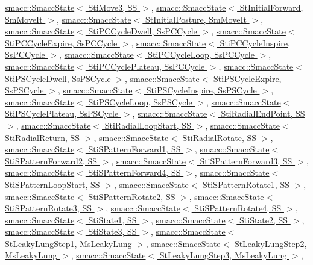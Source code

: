 \hyperlink{classsmacc_1_1SmaccState}{smacc\+::\+Smacc\+State$<$ Sti\+Move3, S\+S $>$}, \hyperlink{classsmacc_1_1SmaccState}{smacc\+::\+Smacc\+State$<$ St\+Initial\+Forward, Sm\+Move\+It $>$}, \hyperlink{classsmacc_1_1SmaccState}{smacc\+::\+Smacc\+State$<$ St\+Initial\+Posture, Sm\+Move\+It $>$}, \hyperlink{classsmacc_1_1SmaccState}{smacc\+::\+Smacc\+State$<$ Sti\+P\+C\+Cycle\+Dwell, Ss\+P\+C\+Cycle $>$}, \hyperlink{classsmacc_1_1SmaccState}{smacc\+::\+Smacc\+State$<$ Sti\+P\+C\+Cycle\+Expire, Ss\+P\+C\+Cycle $>$}, \hyperlink{classsmacc_1_1SmaccState}{smacc\+::\+Smacc\+State$<$ Sti\+P\+C\+Cycle\+Inspire, Ss\+P\+C\+Cycle $>$}, \hyperlink{classsmacc_1_1SmaccState}{smacc\+::\+Smacc\+State$<$ Sti\+P\+C\+Cycle\+Loop, Ss\+P\+C\+Cycle $>$}, \hyperlink{classsmacc_1_1SmaccState}{smacc\+::\+Smacc\+State$<$ Sti\+P\+C\+Cycle\+Plateau, Ss\+P\+C\+Cycle $>$}, \hyperlink{classsmacc_1_1SmaccState}{smacc\+::\+Smacc\+State$<$ Sti\+P\+S\+Cycle\+Dwell, Ss\+P\+S\+Cycle $>$}, \hyperlink{classsmacc_1_1SmaccState}{smacc\+::\+Smacc\+State$<$ Sti\+P\+S\+Cycle\+Expire, Ss\+P\+S\+Cycle $>$}, \hyperlink{classsmacc_1_1SmaccState}{smacc\+::\+Smacc\+State$<$ Sti\+P\+S\+Cycle\+Inspire, Ss\+P\+S\+Cycle $>$}, \hyperlink{classsmacc_1_1SmaccState}{smacc\+::\+Smacc\+State$<$ Sti\+P\+S\+Cycle\+Loop, Ss\+P\+S\+Cycle $>$}, \hyperlink{classsmacc_1_1SmaccState}{smacc\+::\+Smacc\+State$<$ Sti\+P\+S\+Cycle\+Plateau, Ss\+P\+S\+Cycle $>$}, \hyperlink{classsmacc_1_1SmaccState}{smacc\+::\+Smacc\+State$<$ Sti\+Radial\+End\+Point, S\+S $>$}, \hyperlink{classsmacc_1_1SmaccState}{smacc\+::\+Smacc\+State$<$ Sti\+Radial\+Loop\+Start, S\+S $>$}, \hyperlink{classsmacc_1_1SmaccState}{smacc\+::\+Smacc\+State$<$ Sti\+Radial\+Return, S\+S $>$}, \hyperlink{classsmacc_1_1SmaccState}{smacc\+::\+Smacc\+State$<$ Sti\+Radial\+Rotate, S\+S $>$}, \hyperlink{classsmacc_1_1SmaccState}{smacc\+::\+Smacc\+State$<$ Sti\+S\+Pattern\+Forward1, S\+S $>$}, \hyperlink{classsmacc_1_1SmaccState}{smacc\+::\+Smacc\+State$<$ Sti\+S\+Pattern\+Forward2, S\+S $>$}, \hyperlink{classsmacc_1_1SmaccState}{smacc\+::\+Smacc\+State$<$ Sti\+S\+Pattern\+Forward3, S\+S $>$}, \hyperlink{classsmacc_1_1SmaccState}{smacc\+::\+Smacc\+State$<$ Sti\+S\+Pattern\+Forward4, S\+S $>$}, \hyperlink{classsmacc_1_1SmaccState}{smacc\+::\+Smacc\+State$<$ Sti\+S\+Pattern\+Loop\+Start, S\+S $>$}, \hyperlink{classsmacc_1_1SmaccState}{smacc\+::\+Smacc\+State$<$ Sti\+S\+Pattern\+Rotate1, S\+S $>$}, \hyperlink{classsmacc_1_1SmaccState}{smacc\+::\+Smacc\+State$<$ Sti\+S\+Pattern\+Rotate2, S\+S $>$}, \hyperlink{classsmacc_1_1SmaccState}{smacc\+::\+Smacc\+State$<$ Sti\+S\+Pattern\+Rotate3, S\+S $>$}, \hyperlink{classsmacc_1_1SmaccState}{smacc\+::\+Smacc\+State$<$ Sti\+S\+Pattern\+Rotate4, S\+S $>$}, \hyperlink{classsmacc_1_1SmaccState}{smacc\+::\+Smacc\+State$<$ Sti\+State1, S\+S $>$}, \hyperlink{classsmacc_1_1SmaccState}{smacc\+::\+Smacc\+State$<$ Sti\+State2, S\+S $>$}, \hyperlink{classsmacc_1_1SmaccState}{smacc\+::\+Smacc\+State$<$ Sti\+State3, S\+S $>$}, \hyperlink{classsmacc_1_1SmaccState}{smacc\+::\+Smacc\+State$<$ St\+Leaky\+Lung\+Step1, Ms\+Leaky\+Lung $>$}, \hyperlink{classsmacc_1_1SmaccState}{smacc\+::\+Smacc\+State$<$ St\+Leaky\+Lung\+Step2, Ms\+Leaky\+Lung $>$}, \hyperlink{classsmacc_1_1SmaccState}{smacc\+::\+Smacc\+State$<$ St\+Leaky\+Lung\+Step3, Ms\+Leaky\+Lung $>$}, 